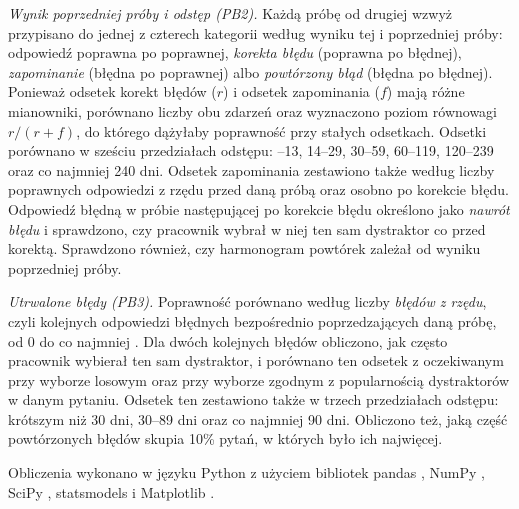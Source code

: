 \emph{Wynik poprzedniej próby i odstęp (PB2).} Każdą próbę od drugiej wzwyż przypisano do jednej
z czterech kategorii według wyniku tej i poprzedniej próby: odpowiedź poprawna po poprawnej,
\emph{korekta błędu} (poprawna po błędnej), \emph{zapominanie} (błędna po poprawnej) albo
\emph{powtórzony błąd} (błędna po błędnej). Ponieważ odsetek korekt błędów ($r$) i odsetek
zapominania ($f$) mają różne mianowniki, porównano liczby obu zdarzeń oraz wyznaczono poziom równowagi
$r/(r+f)$, do którego dążyłaby poprawność przy stałych odsetkach. Odsetki porównano w sześciu
przedziałach odstępu: \MinGapDays--13, 14--29, 30--59, 60--119, 120--239 oraz co najmniej 240 dni. Odsetek zapominania zestawiono także według liczby
poprawnych odpowiedzi z rzędu przed daną próbą oraz osobno po korekcie błędu. Odpowiedź błędną
w próbie następującej po korekcie błędu określono jako \emph{nawrót błędu} i sprawdzono, czy pracownik
wybrał w niej ten sam dystraktor co przed korektą. Sprawdzono również, czy harmonogram
powtórek zależał od wyniku poprzedniej próby.

\emph{Utrwalone błędy (PB3).} Poprawność porównano według liczby \emph{błędów z rzędu}, czyli
kolejnych odpowiedzi błędnych bezpośrednio poprzedzających daną próbę, od 0 do co najmniej \RunMax.
Dla dwóch kolejnych błędów obliczono, jak często pracownik wybierał ten sam dystraktor, i porównano
ten odsetek z oczekiwanym przy wyborze losowym oraz przy wyborze zgodnym z popularnością dystraktorów
w danym pytaniu. Odsetek ten zestawiono także w trzech przedziałach odstępu: krótszym niż 30 dni,
30--89 dni oraz co najmniej 90 dni. Obliczono też, jaką część powtórzonych błędów skupia 10\% pytań, w których było ich
najwięcej.

Obliczenia wykonano w języku Python \VerPython{} z użyciem bibliotek pandas \VerPandas, NumPy
\VerNumpy, SciPy \VerScipy, statsmodels \VerStatsmodels{} i Matplotlib \VerMatplotlib.


